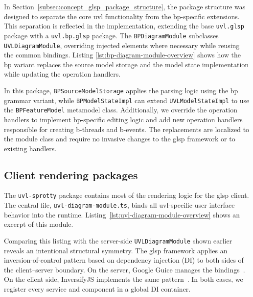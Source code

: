 In Section~\ref{subsec:concept_glsp_package_structure}, the package structure was designed to separate the core \gls{uvl} functionality from the \gls{bp}-specific extensions.
This separation is reflected in the implementation, extending the base \texttt{uvl.glsp} package with a \texttt{uvl.bp.glsp} package.
The \texttt{BPDiagramModule} subclasses \texttt{UVLDiagramModule}, overriding injected elements where necessary while reusing the common bindings.
Listing \ref{lst:bp-diagram-module-overview} shows how the \gls{bp} variant replaces the source model storage and the model state implementation while updating the operation handlers.

In this package, \texttt{BPSourceModelStorage} applies the parsing logic using the \gls{bp} grammar variant, while \texttt{BPModelStateImpl} can extend \texttt{UVLModelStateImpl} to use the \texttt{BPFeatureModel} metamodel class.
Additionally, we override the operation handlers to implement \gls{bp}-specific editing logic and add new operation handlers responsible for creating b-threads and b-events.
The replacements are localized to the module class and require no invasive changes to the \gls{glsp} framework or to existing handlers.

\subsection{Client rendering packages}
\label{subsec:impl_overview_client}

The \texttt{uvl-sprotty} package contains most of the rendering logic for the \gls{glsp} client.
The central file, \texttt{uvl-diagram-module.ts}, binds all \gls{uvl}-specific user interface behavior into the runtime.
Listing~\ref{lst:uvl-diagram-module-overview} shows an excerpt of this module.



Comparing this listing with the server-side \texttt{UVLDiagramModule} shown earlier reveals an intentional structural symmetry.
The \gls{glsp} framework applies an inversion-of-control pattern based on dependency injection (DI) to both sides of the client--server boundary.
On the server, Google Guice manages the bindings~\cite{noauthor_googleguice_2026}.
On the client side, InversifyJS implements the same pattern~\cite{noauthor_inversifymonorepo_2026}.
In both cases, we register every service and component in a global DI container.

